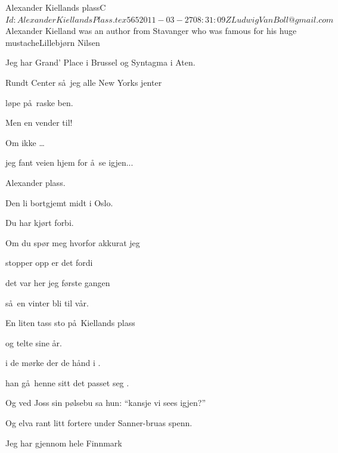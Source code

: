 \begin{SBSong}{Alexander Kiellands plass}{C}
  {$Id: AlexanderKiellandsPlass.tex 565 2011-03-27 08:31:09Z LudwigVanBoll@gmail.com $}
  {Alexander Kielland was an author from Stavanger who was famous for his huge mustache}{Lillebj\o rn Nilsen}
  \begin{SBVerse}
    Jeg har  Grand' Place i Brussel og Syntagma i Aten.

    Rundt  Center s\aa\ jeg alle New Yorks jenter

    l\o pe  p\aa\ raske ben.

    Men en  vender til!

    Om ikke        \ldots {} 

    jeg fant veien hjem for \aa\ se igjen...

    Alexander  plass. 
  \end{SBVerse}
  \begin{SBVerse}
    Den li bortgjemt midt i Oslo.

    Du har  kj\o rt forbi.

    Om du sp\o r meg hvorfor akkurat jeg

    stopper opp er det fordi

    det var her jeg f\o rste gangen

    s\aa\ en vinter bli til v\aa r.

    En liten tass sto p\aa\ Kiellands plass

    og telte sine \aa r.
  \end{SBVerse}
  \begin{SBVerse}
     i de m\o rke  der  de h\aa nd i .

     han g\aa\ henne  sitt  det passet seg .  

    Og ved Joss sin p\o lsebu sa hun: ``kansje vi sees igjen?''

    Og elva rant litt fortere under Sanner-bruas spenn.
  \end{SBVerse}
  \CBPageBrk
  \begin{SBVerse}
    Jeg har  gjennom hele Finnmark


\end{SBVerse}
\end{SBSong}
